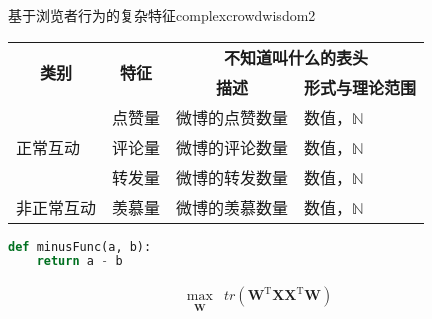 \begin{bupttable}{基于浏览者行为的复杂特征}{complexcrowdwisdom2}
    \begin{tabular}{l|l|l|l}
        \hline
        \multicolumn{1}{c|}{\multirow{2}{*}{\textbf{类别}}} & \multicolumn{1}{c|}{\multirow{2}{*}{\textbf{特征}}} & \multicolumn{2}{c}{\textbf{不知道叫什么的表头}}                                        \\
        \cline{3-4}
                                                          &                                                   & \multicolumn{1}{c|}{\textbf{描述}}       & \multicolumn{1}{c}{\textbf{形式与理论范围}} \\
        \hline
        \multirow{3}{*}{正常互动}                             & 点赞量                                               & 微博的点赞数量                                & 数值，$\mathbb{N}$                      \\
        \cline{2-4}
                                                          & 评论量                                               & 微博的评论数量                                & 数值，$\mathbb{N}$                      \\
        \cline{2-4}
                                                          & 转发量                                               & 微博的转发数量                                & 数值，$\mathbb{N}$                      \\
        \hline
        非正常互动                                             & 羡慕量                                               & 微博的羡慕数量                                & 数值，$\mathbb{N}$                      \\
        \hline
    \end{tabular}
\end{bupttable}

\begin{lstlisting}[language=Python, caption=减法, label=minus, tabsize=2]  
def minusFunc(a, b):
    return a - b 
\end{lstlisting}

\begin{equation}
    \label{PCA_goal}
    \begin{aligned}
        \max_{\substack{\bm{W}}} & tr(\bm{W}^\mathrm{T}\bm{X}\bm{X}^ \mathrm{T}\bm{W})
    \end{aligned}
\end{equation}

